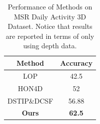 \documentclass[review]{elsarticle}
\begin{document}
\begin{table}[H]
 	\begin{center}
 		\begin{tabular}{c|c}
 		
 		{\bf Method} & {\bf Accuracy} \\
 		\hline
       LOP \cite{wang2012mining} &       42.5 \\
 		
     HON4D \cite{oreifej2013hon4d} &         52 \\
 		
 		DSTIP\&DCSF \cite{xia2013spatio} &      56.88 \\
 		\hline
 		{\bf Ours} & {\bf 62.5} \\
 		
 		\end{tabular}
 	\end{center}
 	\caption{\label{lbl:Table_Daily3D}Performance of Methods on MSR Daily Activity 3D Dataset. Notice that results are reported in terms of only using depth data.}
\end{table}
 
\end{document}
